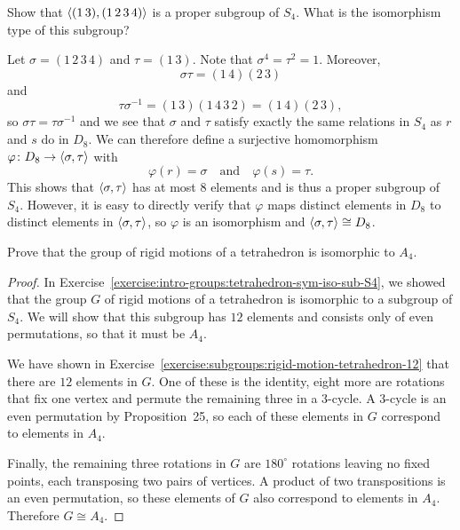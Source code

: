  Show that $\langle{(1\,3), (1\,2\,3\,4)}\rangle$ is a proper subgroup
of $S_4$. What is the isomorphism type of this subgroup?
\begin{solution}
  Let $\sigma = (1\,2\,3\,4)$ and $\tau = (1\,3)$. Note that
  $\sigma^4 = \tau^2 = 1$. Moreover,
  \begin{equation*}
    \sigma\tau = (1\,4)(2\,3)
  \end{equation*}
  and
  \begin{equation*}
    \tau\sigma^{-1} = (1\,3)(1\,4\,3\,2) = (1\,4)(2\,3),
  \end{equation*}
  so $\sigma\tau = \tau\sigma^{-1}$ and we see that $\sigma$ and
  $\tau$ satisfy exactly the same relations in $S_4$ as $r$ and $s$ do
  in $D_8$. We can therefore define a surjective homomorphism
  $\varphi\colon D_8\to\langle{\sigma,\tau}\rangle$ with
  \begin{equation*}
    \varphi(r) = \sigma
    \quad\text{and}\quad
    \varphi(s) = \tau.
  \end{equation*}
  This shows that $\langle{\sigma,\tau}\rangle$ has at most $8$ elements and is
  thus a proper subgroup of $S_4$. However, it is easy to directly
  verify that $\varphi$ maps distinct elements in $D_8$ to distinct
  elements in $\langle{\sigma,\tau}\rangle$, so $\varphi$ is an isomorphism and
  $\langle{\sigma,\tau}\rangle\cong D_8$.
\end{solution}

\label{exercise:quotient-group:tetrahedron-rot-iso-A4}
Prove that the group of rigid motions of a tetrahedron is isomorphic
to $A_4$.
\begin{proof}
  In Exercise~\ref{exercise:intro-groups:tetrahedron-sym-iso-sub-S4},
  we showed that the group $G$ of rigid motions of a tetrahedron is
  isomorphic to a subgroup of $S_4$. We will show that this subgroup
  has $12$ elements and consists only of even permutations, so that it
  must be $A_4$.

  We have shown in
  Exercise~\ref{exercise:subgroups:rigid-motion-tetrahedron-12} that
  there are $12$ elements in $G$. One of these is the identity, eight
  more are rotations that fix one vertex and permute the remaining
  three in a $3$-cycle. A $3$-cycle is an even permutation by
  Proposition~25, so each of these elements in $G$ correspond to
  elements in $A_4$.

  Finally, the remaining three rotations in $G$ are $180^\circ$
  rotations leaving no fixed points, each transposing two pairs of
  vertices. A product of two transpositions is an even permutation, so
  these elements of $G$ also correspond to elements in
  $A_4$. Therefore $G\cong A_4$.
\end{proof}

